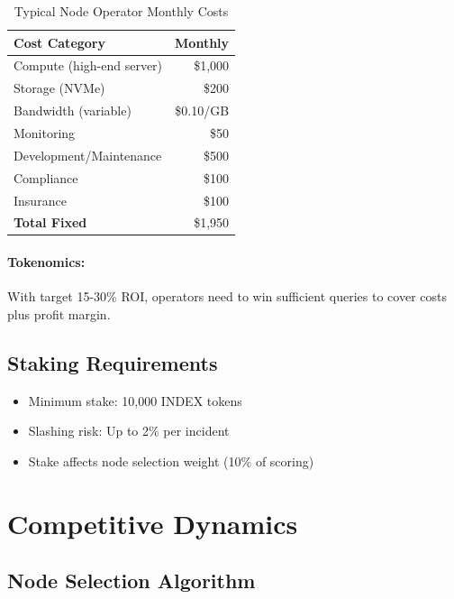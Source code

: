 \documentclass[12pt,a4paper]{article}
\begin{document}
\begin{table}[h]
\centering
\begin{tabular}{lr}
\toprule
\textbf{Cost Category} & \textbf{Monthly} \\
\midrule
Compute (high-end server) & \$1,000 \\
Storage (NVMe) & \$200 \\
Bandwidth (variable) & \$0.10/GB \\
Monitoring & \$50 \\
Development/Maintenance & \$500 \\
Compliance & \$100 \\
Insurance & \$100 \\
\midrule
\textbf{Total Fixed} & \$1,950 \\
\bottomrule
\end{tabular}
\caption{Typical Node Operator Monthly Costs}
\end{table}

\paragraph{Tokenomics:} With target 15-30\% ROI, operators need to win sufficient queries to cover costs plus profit margin.

\subsection{Staking Requirements}

\begin{itemize}
    \item Minimum stake: 10,000 INDEX tokens
    \item Slashing risk: Up to 2\% per incident
    \item Stake affects node selection weight (10\% of scoring)
\end{itemize}

\section{Competitive Dynamics}

\subsection{Node Selection Algorithm}
\end{document}
